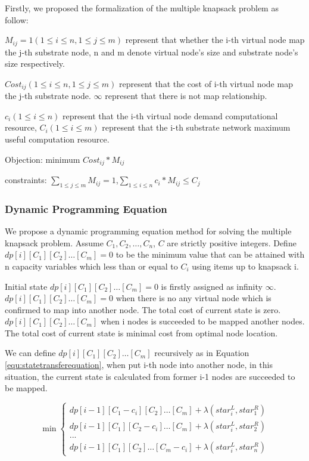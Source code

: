 Firstly, we proposed the formalization of the multiple knapsack problem as follow:

$M_{ij}=1(1\leq i\leq n,1 \leq j \leq m)$ represent that whether the i-th virtual node map the j-th substrate node, n and m denote virtual node's size and substrate node's size respectively.

$Cost_{ij}(1\leq i\leq n,1 \leq j \leq m)$ represent that the cost of i-th virtual node map the j-th substrate node. $\infty$ represent that there is not map relationship.

$c_i(1\leq i\leq n)$ represent that the i-th virtual node demand computational resource, $C_i(1\leq i\leq m)$ represent that the i-th substrate network maximum useful computation resource.

Objection: minimum $Cost_{ij}*M_{ij}$

constraints: $\sum\limits_{1\leq j\leq m} M_{ij}=1$,$\sum\limits_{1\leq i\leq n} c_i*M_{ij}\leq C_j$

\subsubsection{Dynamic Programming Equation}
\label{lab:DynamicProgrammingEquation}
We propose a dynamic programming equation method for solving the multiple knapsack problem. Assume $C_1,C_2,\ldots,C_n$, $C$ are strictly positive integers. Define $dp[i][{C_1}][{C_2}] \ldots [{C_m}]=0$ to be the minimum value that can be attained with n capacity variables  which less than or equal to $C_i$ using items up to knapsack i.

Initial state $dp[i][{C_1}][{C_2}] \ldots [{C_m}]=0$ is firstly assigned as infinity $\infty$. $dp[i][{C_1}][{C_2}] \ldots [{C_m}]=0$ when there is no any virtual node which is confirmed to map into another node. The total cost of current state is zero. $dp[i][{C_1}][{C_2}] \ldots [{C_m}]$ when  i nodes is succeeded to be mapped another nodes. The total cost of current state is minimal cost from optimal node location.

We can define $dp[i][{C_1}][{C_2}] \ldots [{C_m}]$ recursively as in Equation \ref{equ:statetransferequation}, when put i-th node into another node, in this situation, the current state is calculated from former i-1 nodes are succeeded to be mapped.

\begin{equation}
\label{equ:statetransferequation}
\min \left\{ \begin{array}{l}
dp[i - 1][{C_1-c_i}][{C_2}] \ldots [{C_m}]+\lambda(star^L_i,star^R_1)\\
dp[i - 1][{C_1}][{C_2-c_i}] \ldots [{C_m}]+\lambda(star^L_i,star^R_2)\\
...\\
dp[i - 1][{C_1}][{C_2}] \ldots [{C_m-c_i}]+\lambda(star^L_i,star^R_n)
\end{array} \right.
\end{equation}


